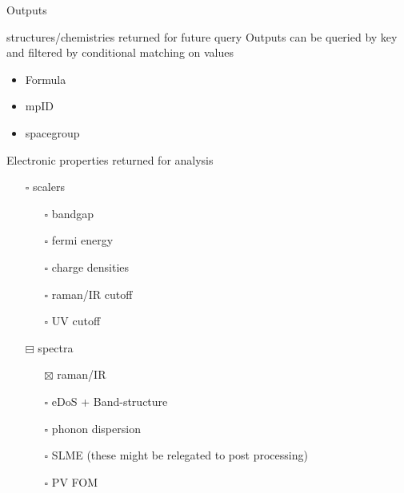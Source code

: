 \documentclass[8pt, compress]{beamer}
\begin{document}
\begin{frame}[allowframebreaks]{Outputs}
\begin{block}{structures/chemistries returned for future query}
Outputs can be queried by key and filtered by conditional matching on values
\begin{itemize}
\item Formula
\item mpID
\item spacegroup
\end{itemize}
\end{block}
\begin{block}{Electronic properties returned for analysis}
\begin{itemize}
\item[{$\square$}] scalers
\begin{itemize}
\item[{$\square$}] bandgap
\item[{$\square$}] fermi energy
\item[{$\square$}] charge densities
\item[{$\square$}] raman/IR cutoff
\item[{$\square$}] UV cutoff
\end{itemize}
\item[{$\boxminus$}] spectra
\begin{itemize}
\item[{$\boxtimes$}] raman/IR
\item[{$\square$}] eDoS + Band-structure
\item[{$\square$}] phonon dispersion
\item[{$\square$}] SLME (these might be relegated to post processing)
\item[{$\square$}] PV FOM
\end{itemize}
\end{itemize}
\end{block}
\end{frame}
\end{document}
